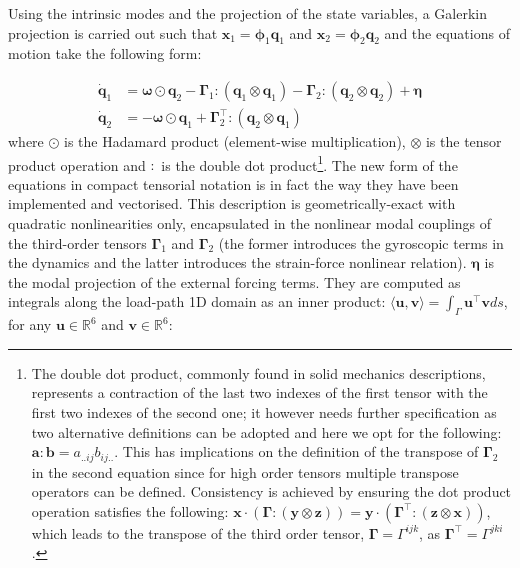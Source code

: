 \documentclass[11pt]{article}
\begin{document}
Using the intrinsic modes and the projection of the state variables, a Galerkin projection is carried out such that \(\pmb{x}_1 = \pmb{\phi}_1\pmb{q}_1\) and \(\pmb{x}_2 = \pmb{\phi}_2\pmb{q}_2\) and the equations of motion take the following form:

\begin{equation}
\label{eq2:sol_qs}
\begin{split}
\dot{\pmb{q}}_{1} &=  \pmb{\omega} \odot  \pmb{q}_{2} - \pmb{\Gamma}_{1} \pmb{:} \left(\pmb{q}_{1} \otimes \pmb{q}_{1} \right) - \pmb{\Gamma}_{2} \pmb{:} \left( \pmb{q}_{2} \otimes  \pmb{q}_{2} \right) + \bm{\eta}  \\
\dot{\pmb{q}}_{2} &= -\pmb{\omega} \odot \pmb{q}_{1} + \pmb{\Gamma}_{2}^{\top} \pmb{:} \left( \pmb{q}_{2} \otimes  \pmb{q}_{1} \right)
\end{split}
\end{equation}
where \(\odot\) is the  Hadamard product (element-wise multiplication), \(\otimes\) is the tensor product operation and \(\pmb{:}\) is the double dot product\footnote{The double dot product, commonly found in solid mechanics descriptions, represents a contraction of the last two indexes of the first tensor with the first two indexes of the second one; it however needs further specification as two alternative definitions can be adopted and here we opt for the following: \(\pmb{a} \pmb{:} \pmb{b} = a_{..ij} b_{ij..}\). This has implications on the definition of the transpose of \(\bm{\Gamma}_2\) in the second equation since for high order tensors multiple transpose operators can be defined. Consistency is achieved by ensuring the dot product operation satisfies the following: \(\pmb{x} \cdot \left(\bm{\Gamma} \pmb{:} \left( \pmb{y} \otimes \pmb{z} \right)  \right) = \pmb{y} \cdot \left(\bm{\Gamma}^{\top} \pmb{:} \left(\pmb{z} \otimes \pmb{x} \right)  \right)\), which leads to the transpose of the third order tensor, \(\bm{\Gamma} = \Gamma^{ijk}\), as \(\bm{\Gamma}^{\top} = \Gamma^{jki}\).}.
The new form of the equations in compact tensorial notation is in fact the way they have been implemented and vectorised. This description is geometrically-exact with quadratic nonlinearities only, encapsulated in the nonlinear modal couplings of the third-order tensors \(\pmb{\Gamma}_{1}\) and \(\pmb{\Gamma}_{2}\) (the former introduces the gyroscopic terms in the dynamics and the latter introduces the strain-force nonlinear relation). \(\pmb{\eta}\) is the modal projection of the external forcing terms. They are computed as integrals along the load-path 1D domain as an inner product: \(\langle \pmb{u},\pmb{v}  \rangle = \int_\Gamma \pmb{u}^\top \pmb{v} ds\), for any \(\pmb{u}\in\mathbb{R}^6\) and \(\pmb{v}\in\mathbb{R}^6\):
\end{document}
